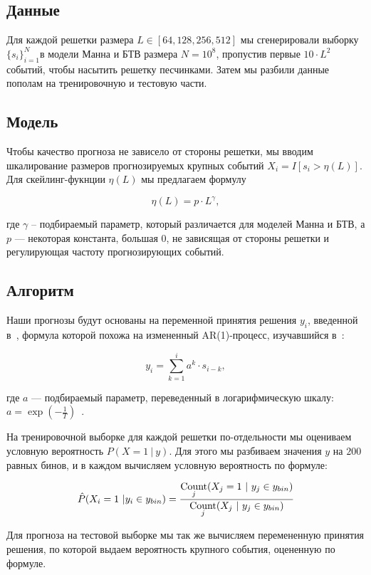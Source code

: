 \subsection{Данные}
Для каждой решетки размера $L \in [64, 128, 256, 512]$ мы сгенерировали выборку $\{s_i\}_{i=1}^{N}$в модели Манна и БТВ размера $N=10^8$, пропустив первые $10 \cdot L^2$ событий, чтобы насытить решетку песчинками. Затем мы разбили данные пополам на тренировочную и тестовую части.

\subsection{Модель}
Чтобы качество прогноза не зависело от стороны решетки, мы вводим шкалирование размеров прогнозируемых крупных событий $X_i = I[s_i > \eta(L)]$. Для скейлинг-фукнции $\eta(L)$ мы предлагаем формулу

$$ \eta(L) = p \cdot L^\gamma, $$

\noindent где $\gamma$ -- подбираемый параметр, который различается для моделей Манна и БТВ, а $p$ --- некоторая константа, большая $0$, не зависящая от стороны решетки и регулирующая частоту прогнозирующих событий.

\subsection{Алгоритм}

Наши прогнозы будут основаны на переменной принятия решения $y_i$, введенной в~\cite{Hallerberg2009,Kantz2010}, формула которой похожа на измененный AR(1)-процесс, изучавшийся в~\cite{Lewis1985}:

$$y_i = \sum\limits_{k=1}^{i} a^k \cdot s_{i-k}, $$

\noindent где $a$ --- подбираемый параметр, переведенный в логарифмическую шкалу: $a = \exp\left(-\frac{1}{T}\right)$~\cite{Hallerberg2009}.

На тренировочной выборке для каждой решетки по-отдельности мы оцениваем условную вероятность $P(X=1\ |\ y)$. Для этого мы разбиваем значения $y$ на $200$ равных бинов, и в каждом вычисляем условную вероятность по формуле:

$$ \hat{P}(X_i = 1\ | y_i \in y_{bin}) = \frac{\operatorname*{Count}\limits_{j}(X_j = 1\ |\ y_{j} \in y_{bin})}{\operatorname*{Count}\limits_{j}(X_j\ |\ y_{j} \in y_{bin})} $$

Для прогноза на тестовой выборке мы так же вычисляем перемененную принятия решения, по которой выдаем вероятность крупного события, оцененную по формуле.

